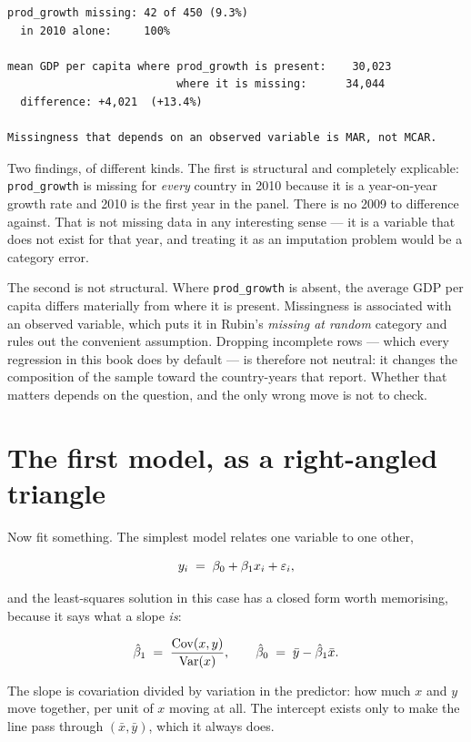 \documentclass[
  letterpaper,
  10pt,
  twoside,
  openright,
  numbers=noenddot,
  chapterprefix=true]{scrbook}
\begin{document}
\begin{verbatim}
prod_growth missing: 42 of 450 (9.3%)
  in 2010 alone:     100%

mean GDP per capita where prod_growth is present:    30,023
                          where it is missing:      34,044
  difference: +4,021  (+13.4%)

Missingness that depends on an observed variable is MAR, not MCAR.
\end{verbatim}

Two findings, of different kinds. The first is structural and completely
explicable: \texttt{prod\_growth} is missing for \emph{every} country in
2010 because it is a year-on-year growth rate and 2010 is the first year
in the panel. There is no 2009 to difference against. That is not
missing data in any interesting sense --- it is a variable that does not
exist for that year, and treating it as an imputation problem would be a
category error.

The second is not structural. Where \texttt{prod\_growth} is absent, the
average GDP per capita differs materially from where it is present.
Missingness is associated with an observed variable, which puts it in
Rubin's \emph{missing at random} category and rules out the convenient
assumption. Dropping incomplete rows --- which every regression in this
book does by default --- is therefore not neutral: it changes the
composition of the sample toward the country-years that report. Whether
that matters depends on the question, and the only wrong move is not to
check.

\section{The first model, as a right-angled
triangle}\label{the-first-model-as-a-right-angled-triangle}

Now fit something. The simplest model relates one variable to one other,

\[
y_i \thickspace=\thickspace \beta_0 + \beta_1 x_i + \varepsilon_i ,
\]

and the least-squares solution in this case has a closed form worth
memorising, because it says what a slope \emph{is}:

\[
\hat\beta_1 \thickspace=\thickspace \frac{\mathrm{Cov}(x, y)}{\mathrm{Var}(x)},
\qquad
\hat\beta_0 \thickspace=\thickspace \bar y - \hat\beta_1 \bar x .
\]

The slope is covariation divided by variation in the predictor: how much
\(x\) and \(y\) move together, per unit of \(x\) moving at all. The
intercept exists only to make the line pass through
\((\bar x, \bar y)\), which it always does.
\end{document}
